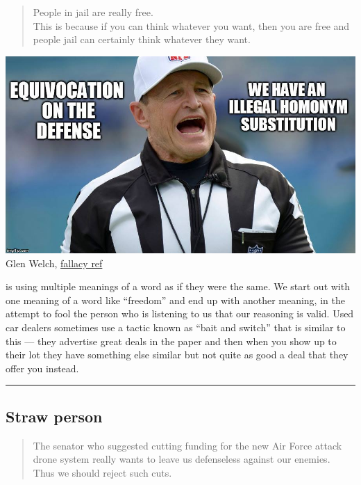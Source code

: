 \documentclass[justified]{tufte-book}
\newenvironment{argument}{\begin{quote}\normalsize}{\end{quote}}
\begin{document}
\begin{argument}
People in jail are really free.\\
This is because if you can think whatever you want, then you are free
and people jail can certainly think whatever they want.
\end{argument}

\begin{marginfigure}
\includegraphics{img/fallacies/equivocation.jpg}\\
Glen Welch, \href{https://twitter.com/fallacy_ref?lang=en}{fallacy ref}
\end{marginfigure}

 is using multiple meanings of a word as if they were the same. We start out with one meaning of a word like ``freedom'' and end up with another meaning, in the attempt to fool the person who is listening to us that our reasoning is valid. Used car dealers sometimes use a tactic known as ``bait and switch'' that is similar to this --- they advertise great deals in the paper and then when you show up to their lot they have something else similar but not quite as good a deal that they offer you instead.

\begin{center}\rule{0.5\linewidth}{\linethickness}\end{center}

\hypertarget{straw-person}{%
\subsection*{Straw person}\label{straw-person}}

\begin{argument}
The senator who suggested cutting funding for the new Air Force attack
drone system really wants to leave us defenseless against our enemies.\\
Thus we should reject such cuts.
\end{argument}
\end{document}
